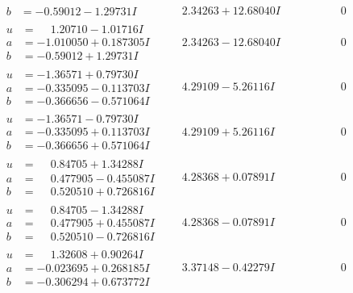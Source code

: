 \documentclass[1p]{elsarticle_modified}
\theoremstyle{definition}
\begin{document}
$$\begin{array}{c|c|c}
\begin{aligned}
b &= -0.59012 - 1.29731 I\end{aligned}
 & \phantom{-}2.34263 + 12.68040 I & \phantom{-0.000000 } 0 \\ \hline\begin{aligned}
u &= \phantom{-}1.20710 - 1.01716 I \\
a &= -1.010050 + 0.187305 I \\
b &= -0.59012 + 1.29731 I\end{aligned}
 & \phantom{-}2.34263 - 12.68040 I & \phantom{-0.000000 } 0 \\ \hline\begin{aligned}
u &= -1.36571 + 0.79730 I \\
a &= -0.335095 - 0.113703 I \\
b &= -0.366656 - 0.571064 I\end{aligned}
 & \phantom{-}4.29109 - 5.26116 I & \phantom{-0.000000 } 0 \\ \hline\begin{aligned}
u &= -1.36571 - 0.79730 I \\
a &= -0.335095 + 0.113703 I \\
b &= -0.366656 + 0.571064 I\end{aligned}
 & \phantom{-}4.29109 + 5.26116 I & \phantom{-0.000000 } 0 \\ \hline\begin{aligned}
u &= \phantom{-}0.84705 + 1.34288 I \\
a &= \phantom{-}0.477905 - 0.455087 I \\
b &= \phantom{-}0.520510 + 0.726816 I\end{aligned}
 & \phantom{-}4.28368 + 0.07891 I & \phantom{-0.000000 } 0 \\ \hline\begin{aligned}
u &= \phantom{-}0.84705 - 1.34288 I \\
a &= \phantom{-}0.477905 + 0.455087 I \\
b &= \phantom{-}0.520510 - 0.726816 I\end{aligned}
 & \phantom{-}4.28368 - 0.07891 I & \phantom{-0.000000 } 0 \\ \hline\begin{aligned}
u &= \phantom{-}1.32608 + 0.90264 I \\
a &= -0.023695 + 0.268185 I \\
b &= -0.306294 + 0.673772 I\end{aligned}
 & \phantom{-}3.37148 - 0.42279 I & \phantom{-0.000000 } 0 \\ \hline\begin{aligned}

\end{aligned}
\end{array}$$
\end{document}
